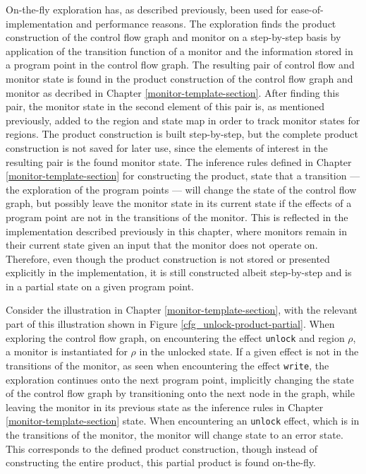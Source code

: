 \newpar On-the-fly exploration has, as described previously, been used for ease-of-implementation and performance reasons. The exploration finds the product construction of the control flow graph and monitor on a step-by-step basis by application of the transition function of a monitor and the information stored in a program point in the control flow graph. The resulting pair of control flow and monitor state is found in the product construction of the control flow graph and monitor as decribed in Chapter \ref{monitor-template-section}. After finding this pair, the monitor state in the second element of this pair is, as mentioned previously, added to the region and state map in order to track monitor states for regions. The product construction is built step-by-step, but the complete product construction is not saved for later use, since the elements of interest in the resulting pair is the found monitor state. The inference rules defined in Chapter \ref{monitor-template-section} for constructing the product, state that a transition --- the exploration of the program points --- will change the state of the control flow graph, but possibly leave the monitor state in its current state if the effects of a program point are not in the transitions of the monitor. This is reflected in the implementation described previously in this chapter, where monitors remain in their current state given an input that the monitor does not operate on. Therefore, even though the product construction is not stored or presented explicitly in the implementation, it is still constructed albeit step-by-step and is in a partial state on a given program point.

\newpar Consider the illustration in Chapter \ref{monitor-template-section}, with the relevant part of this illustration shown in Figure \ref{cfg_unlock-product-partial}. When exploring the control flow graph, on encountering the effect \texttt{unlock} and region $\rho$, a monitor is instantiated for $\rho$ in the unlocked state. If a given effect is not in the transitions of the monitor, as seen when encountering the effect \texttt{write}, the exploration continues onto the next program point, implicitly changing the state of the control flow graph by transitioning onto the next node in the graph, while leaving the monitor in its previous state as the inference rules in Chapter \ref{monitor-template-section} state. When encountering an \texttt{unlock} effect, which is in the transitions of the monitor, the monitor will change state to an error state. This corresponds to the defined product construction, though instead of constructing the entire product, this partial product is found on-the-fly. 


